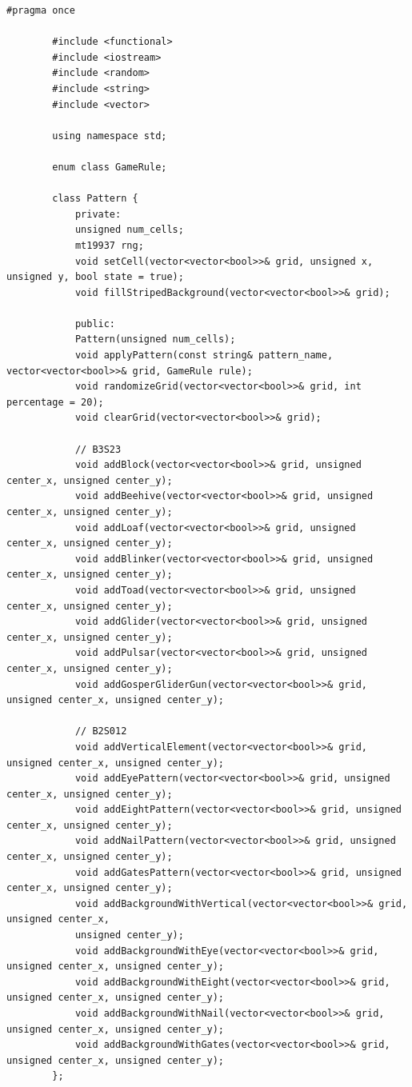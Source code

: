 \documentclass[14pt,a4paper]{extarticle}
\theoremstyle{plain}
\begin{document}
	\begin{lstlisting}[title=pattern.h, gobble=16, breaklines=true, showspaces=false, showtabs=false, breakatwhitespace=true]
		#pragma once
		
		#include <functional>
		#include <iostream>
		#include <random>
		#include <string>
		#include <vector>
		
		using namespace std;
		
		enum class GameRule;
		
		class Pattern {
			private:
			unsigned num_cells;
			mt19937 rng;
			void setCell(vector<vector<bool>>& grid, unsigned x, unsigned y, bool state = true);
			void fillStripedBackground(vector<vector<bool>>& grid);
			
			public:
			Pattern(unsigned num_cells);
			void applyPattern(const string& pattern_name, vector<vector<bool>>& grid, GameRule rule);
			void randomizeGrid(vector<vector<bool>>& grid, int percentage = 20);
			void clearGrid(vector<vector<bool>>& grid);
			
			// B3S23
			void addBlock(vector<vector<bool>>& grid, unsigned center_x, unsigned center_y);
			void addBeehive(vector<vector<bool>>& grid, unsigned center_x, unsigned center_y);
			void addLoaf(vector<vector<bool>>& grid, unsigned center_x, unsigned center_y);
			void addBlinker(vector<vector<bool>>& grid, unsigned center_x, unsigned center_y);
			void addToad(vector<vector<bool>>& grid, unsigned center_x, unsigned center_y);
			void addGlider(vector<vector<bool>>& grid, unsigned center_x, unsigned center_y);
			void addPulsar(vector<vector<bool>>& grid, unsigned center_x, unsigned center_y);
			void addGosperGliderGun(vector<vector<bool>>& grid, unsigned center_x, unsigned center_y);
			
			// B2S012
			void addVerticalElement(vector<vector<bool>>& grid, unsigned center_x, unsigned center_y);
			void addEyePattern(vector<vector<bool>>& grid, unsigned center_x, unsigned center_y);
			void addEightPattern(vector<vector<bool>>& grid, unsigned center_x, unsigned center_y);
			void addNailPattern(vector<vector<bool>>& grid, unsigned center_x, unsigned center_y);
			void addGatesPattern(vector<vector<bool>>& grid, unsigned center_x, unsigned center_y);
			void addBackgroundWithVertical(vector<vector<bool>>& grid, unsigned center_x,
			unsigned center_y);
			void addBackgroundWithEye(vector<vector<bool>>& grid, unsigned center_x, unsigned center_y);
			void addBackgroundWithEight(vector<vector<bool>>& grid, unsigned center_x, unsigned center_y);
			void addBackgroundWithNail(vector<vector<bool>>& grid, unsigned center_x, unsigned center_y);
			void addBackgroundWithGates(vector<vector<bool>>& grid, unsigned center_x, unsigned center_y);
		};
	\end{lstlisting}
	
\end{document}
